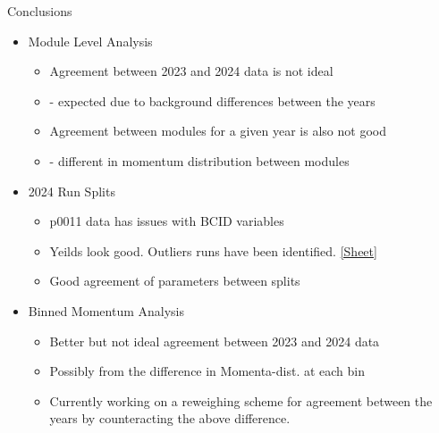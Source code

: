 \begin{frame}{Conclusions}
    \begin{itemize}
        \item Module Level Analysis
        \begin{itemize}
            \item Agreement between 2023 and 2024 data is not ideal 
            \item[] - expected due to background differences between the years
            \item Agreement between modules for a given year is also not good 
            \item[] - different in momentum distribution between modules
        \end{itemize}
        \item 2024 Run Splits
        \begin{itemize}
            \item p0011 data has issues with BCID variables
            \item Yeilds look good. Outliers runs have been identified. \href{https://docs.google.com/spreadsheets/d/1nnYFcmhVieSHI5XAVhPiW1K6CoGYGxv2YPchwL0sqH4/edit?usp=sharing}{[Sheet]}
            \item Good agreement of parameters between splits
        \end{itemize}
        \item Binned Momentum Analysis
        \begin{itemize}
            \item Better but not ideal agreement between 2023 and 2024 data
            \item Possibly from the difference in Momenta-dist. at each bin
            \item Currently working on a reweighing scheme for agreement between the years by counteracting the above difference.
        \end{itemize}
    \end{itemize}
\end{frame}